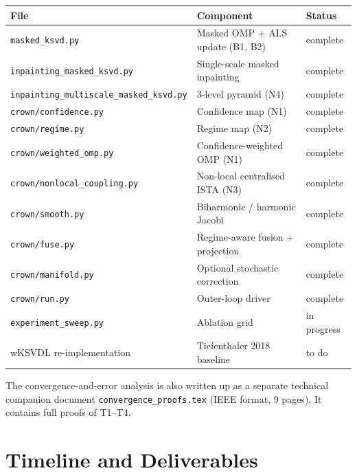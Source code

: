 \documentclass[11pt,a4paper]{article}
\theoremstyle{definition}
\theoremstyle{remark}
\begin{document}
\begin{center}
\small
\begin{tabular}{@{}lll@{}}
\toprule
File & Component & Status \\
\midrule
\texttt{masked\_ksvd.py}              & Masked OMP + ALS update (B1, B2)        & complete \\
\texttt{inpainting\_masked\_ksvd.py}  & Single-scale masked inpainting           & complete \\
\texttt{inpainting\_multiscale\_masked\_ksvd.py} & 3-level pyramid (N4)        & complete \\
\texttt{crown/confidence.py}          & Confidence map (N1)                      & complete \\
\texttt{crown/regime.py}              & Regime map (N2)                          & complete \\
\texttt{crown/weighted\_omp.py}       & Confidence-weighted OMP (N1)             & complete \\
\texttt{crown/nonlocal\_coupling.py}  & Non-local centralised ISTA (N3)          & complete \\
\texttt{crown/smooth.py}              & Biharmonic / harmonic Jacobi             & complete \\
\texttt{crown/fuse.py}                & Regime-aware fusion + projection         & complete \\
\texttt{crown/manifold.py}            & Optional stochastic correction           & complete \\
\texttt{crown/run.py}                 & Outer-loop driver                        & complete \\
\texttt{experiment\_sweep.py}         & Ablation grid                            & in progress \\
wKSVDL re-implementation              & Tiefenthaler 2018 baseline              & to do \\
\bottomrule
\end{tabular}
\end{center}

The convergence-and-error analysis is also written up as a separate
technical companion document \texttt{convergence\_proofs.tex}
(IEEE format, 9 pages). It contains full proofs of T1--T4.

\section{Timeline and Deliverables}
\end{document}
